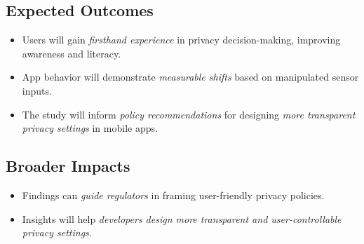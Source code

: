 \documentclass[acmlarge, nonacm]{acmart}
\begin{document}
\subsection{Expected Outcomes}
\begin{itemize}
    \item Users will gain \textit{firsthand experience} in privacy decision-making, improving awareness and literacy.
    \item App behavior will demonstrate \textit{measurable shifts} based on manipulated sensor inputs.
    \item The study will inform \textit{policy recommendations} for designing \textit{more transparent privacy settings} in mobile apps.
\end{itemize}

\subsection{Broader Impacts}
\begin{itemize}
    \item Findings can \textit{guide regulators} in framing user-friendly privacy policies.
    \item Insights will help \textit{developers design more transparent and user-controllable privacy settings}.
\end{itemize}




\end{document}
